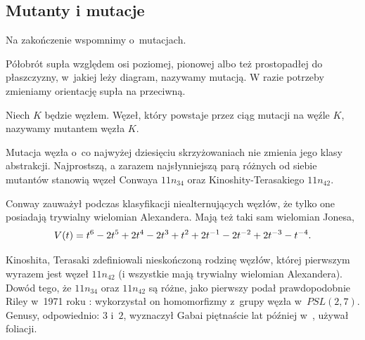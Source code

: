 
\subsection{Mutanty i mutacje}
%
%
\label{sec:mutant}%
Na zakończenie wspomnimy o~mutacjach.

\begin{definition}[mutacja]
    Półobrót supła względem osi poziomej, pionowej albo też prostopadłej do płaszczyzny, w~jakiej leży diagram, nazywamy mutacją.
    W razie potrzeby zmieniamy orientację supła na przeciwną.
\end{definition}

\begin{definition}[mutant]
\label{def:mutant}%
    Niech $K$ będzie węzłem.
    Węzeł, który powstaje przez ciąg mutacji na węźle $K$, nazywamy mutantem węzła $K$.
\end{definition}

Mutacja węzła o~co najwyżej dziesięciu skrzyżowaniach nie zmienia jego klasy abstrakcji.
Najprostszą, a zarazem najsłynniejszą parą różnych od siebie mutantów stanowią węzeł Conwaya $11n_{34}$ oraz Kinoshity-Terasakiego $11n_{42}$.
%
%

Conway zauważył podczas klasyfikacji niealternujących węzłów, że tylko one posiadają trywialny wielomian Alexandera.
Mają też taki sam wielomian Jonesa,
\begin{equation}
    V(t) = t^{6} -2t^5 +2t^4 -2t^3 +t^2 +2t^{-1} -2t^{-2} +2t^{-3} -t^{-4}.
\end{equation}

Kinoshita, Terasaki \cite{kinoshita1957} zdefiniowali nieskończoną rodzinę węzłów, której pierwszym wyrazem jest węzeł $11n_{42}$ (i wszystkie mają trywialny wielomian Alexandera).
%
%
Dowód tego, że $11n_{34}$ oraz $11n_{42}$ są różne, jako pierwszy podał prawdopodobnie Riley w~1971 roku \cite{riley1971}: wykorzystał on homomorfizmy z~grupy węzła w~$PSL(2, 7)$.
%
Genusy, odpowiednio: $3$ i~$2$, wyznaczył Gabai piętnaście lat później w~\cite{gabai1986}, używał foliacji.
%


